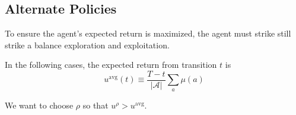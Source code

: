 \subsection{Alternate Policies}
\begin{summary}
    To ensure the agent's expected return is maximized, the agent must strike still strike a balance exploration and exploitation. 
    \vspace{1em}

    In the following cases, the expected return from transition $t$ is 
    \begin{equation*}
        u^{\text{avg}} (t) \equiv \frac{T-t}{|\mathcal{A}|} \sum_{a} \mu(a)
    \end{equation*}

    We want to choose $\rho$ so that $u^\rho > u^{\text{avg}}$. 


\end{summary}
